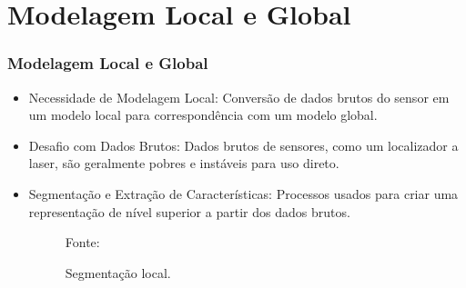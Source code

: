\documentclass[xcolor=dvipsnames, aspectratio=169]{beamer}
\begin{document}
\section{Modelagem Local e Global}
\begin{frame}
  \frametitle{Modelagem Local e Global}
  \begin{itemize}
      \item Necessidade de Modelagem Local: Conversão de dados brutos do sensor em um modelo local para correspondência com um modelo global.
      \item Desafio com Dados Brutos: Dados brutos de sensores, como um localizador a laser, são geralmente pobres e instáveis para uso direto.
      \item Segmentação e Extração de Características: Processos usados para criar uma representação de nível superior a partir dos dados brutos.
      \begin{figure}
        \centering
        {Fonte: \cite{buniyamin2011simple}}
        \caption{Segmentação local.}
        \label{fig:1_range_sensor_obstacle}
      \end{figure}
  \end{itemize}
\end{frame}
  

\end{document}
